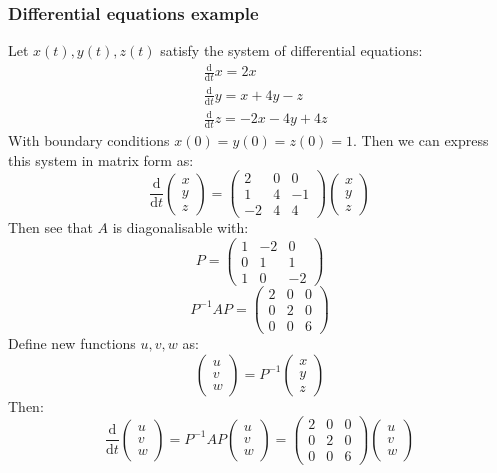 \documentclass[12pt]{article}
\newcommand{\df}[2]{\frac{\text{d}#1}{\text{d}#2}}
\begin{document}
\subsubsection*{Differential equations example}
Let \(x(t),y(t),z(t)\) satisfy the system of differential equations:
\begin{align*}
    &\df{}{t}x=2x \\
    &\df{}{t}y=x+4y-z \\
    &\df{}{t}z=-2x-4y+4z
\end{align*}
With boundary conditions \(x(0)=y(0)=z(0)=1\). Then we can express this system in matrix form as:
\[\df{}{t}\begin{pmatrix}
    x \\ y \\ z
\end{pmatrix}=\begin{pmatrix}
    2 & 0 & 0 \\
    1 & 4 & -1 \\
    -2 & 4 & 4
\end{pmatrix}\begin{pmatrix}
    x \\ y \\ z
\end{pmatrix}\]
Then see that \(A\) is diagonalisable with:
\[P=\begin{pmatrix}
    1 & -2 & 0 \\
    0 & 1 & 1 \\
    1 & 0 & -2
\end{pmatrix}\]
\[P^{-1}AP=\begin{pmatrix}
    2 & 0 & 0 \\
    0 & 2 & 0 \\
    0 & 0 & 6
\end{pmatrix}\]
Define new functions \(u,v,w\) as:
\[\begin{pmatrix}
    u \\ v \\ w
\end{pmatrix}= P^{-1}\begin{pmatrix}
    x \\ y \\ z
\end{pmatrix}\]
Then:
\[\df{}{t}\begin{pmatrix}
    u \\ v \\ w
\end{pmatrix}=P^{-1}AP\begin{pmatrix}
    u \\ v \\w
\end{pmatrix}=\begin{pmatrix}
    2 & 0 & 0 \\
    0 & 2 & 0 \\
    0 & 0 & 6
\end{pmatrix}\begin{pmatrix}
    u \\ v \\w
\end{pmatrix}\]
\end{document}
